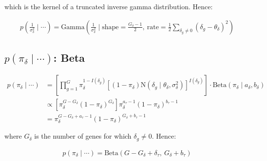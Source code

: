 \documentclass{article}\usepackage{graphicx, color}
\begin{document}
\begin{flushleft}
which is the kernel of a truncated inverse gamma distribution. Hence:

\begin{align*}
p( \frac{1}{\sigma_\delta^2} \mid \cdots ) = \text{Gamma} \left (\frac{1}{\sigma_\delta^2} \mid \text{shape} = \frac{G_\delta - 1}{2}, \ \text{rate} = \frac{1}{2} \sum_{\delta_g \ne 0} (\delta_g - \theta_\delta)^2 \right )
\end{align*}




\subsection{$p(\pi_\delta \mid \cdots)$: Beta}

\begin{align*}
p(\pi_\delta \mid \cdots) &=\left [ \prod_{g = 1}^G  \pi_\delta^{1-I(\delta_g)}[(1- \pi_\delta)\text{N}(\delta_g \mid \theta_\delta, \sigma_\delta^2)]^{I(\delta_g)} \right ] \cdot \text{Beta}(\pi_\delta \mid a_\delta, b_\delta)  \\
&\propto [\pi_\delta^{G - G_\delta}(1-\pi_\delta)^{G_\delta}] \pi_\delta^{a_\tau - 1} (1 - \pi_\delta)^{b_\tau - 1} \\
&= \pi_{\delta}^{G - G_\delta + a_\tau - 1}(1 - \pi_\delta)^{G_\delta + b_\tau - 1}
\end{align*}

where $G_\delta$ is the number of genes for which $\delta_g \ne 0$. Hence:

\begin{align*}
p(\pi_\delta \mid \cdots) = \text{Beta}(G - G_\delta + \delta_\tau, \ G_\delta + b_\tau)
\end{align*}




\end{flushleft}
\newpage 
 

\end{document}
